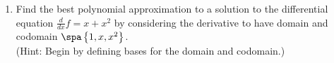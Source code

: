 \begin{enumerate}
\item Find the best polynomial approximation to a solution to the differential equation $\frac{d}{dx} f=x+x^2$ by considering the derivative to have domain and codomain $\spa\left\{ 1,x,x^2  \right\}$. \\
(Hint: Begin by defining bases for the domain and codomain.)
%
%



\end{enumerate}

